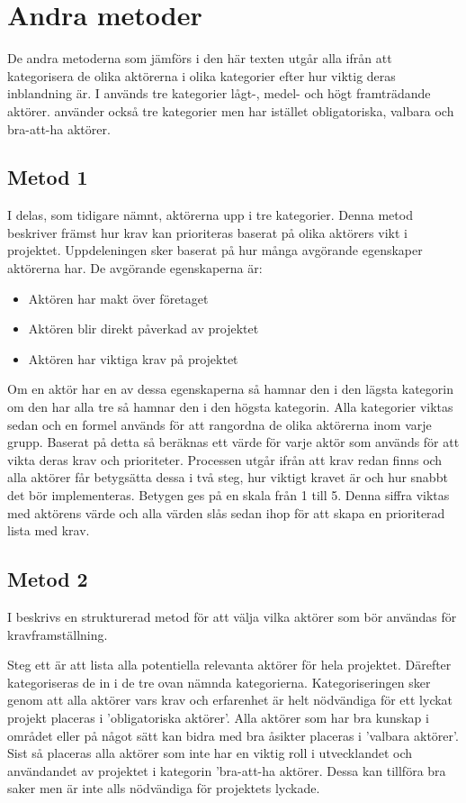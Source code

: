 \section{Andra metoder}
De andra metoderna som jämförs i den här texten utgår alla ifrån att kategorisera de olika aktörerna i olika kategorier efter hur viktig deras inblandning är. I \cite{cs_novel} används tre kategorier lågt-, medel- och högt framträdande aktörer. \cite{cs_sturctured} använder också tre kategorier men har istället obligatoriska, valbara och bra-att-ha aktörer.

\subsection{Metod 1}
I \cite{cs_novel} delas, som tidigare nämnt, aktörerna upp i tre kategorier. Denna metod beskriver främst hur krav kan prioriteras baserat på olika aktörers vikt i projektet.
Uppdeleningen sker baserat på hur många avgörande egenskaper aktörerna har. De avgörande egenskaperna är:
\begin{itemize}
	\item Aktören har makt över företaget
	\item Aktören blir direkt påverkad av projektet
	\item Aktören har viktiga krav på projektet
\end{itemize}

Om en aktör har en av dessa egenskaperna så hamnar den i den lägsta kategorin om den har alla tre så hamnar den i den högsta kategorin. Alla kategorier viktas sedan och en formel används för att rangordna de olika aktörerna inom varje grupp. Baserat på detta så beräknas ett värde för varje aktör som används för att vikta deras krav och prioriteter. Processen utgår ifrån att krav redan finns och alla aktörer får betygsätta dessa i två steg, hur viktigt kravet är och hur snabbt det bör implementeras. Betygen ges på en skala från 1 till 5. Denna siffra viktas med aktörens värde och alla värden slås sedan ihop för att skapa en prioriterad lista med krav.

\subsection{Metod 2}
I \cite{cs_structured} beskrivs en strukturerad metod för att välja vilka aktörer som bör användas för kravframställning.

Steg ett är att lista alla potentiella relevanta aktörer för hela projektet.
Därefter kategoriseras de in i de tre ovan nämnda kategorierna. Kategoriseringen sker genom att alla aktörer vars krav och erfarenhet är helt nödvändiga för ett lyckat projekt placeras i 'obligatoriska aktörer'. Alla aktörer som har bra kunskap i området eller på något sätt kan bidra med bra åsikter placeras i 'valbara aktörer'. Sist så placeras alla aktörer som inte har en viktig roll i utvecklandet och användandet av projektet i kategorin 'bra-att-ha aktörer. Dessa kan tillföra bra saker men är inte alls nödvändiga för projektets lyckade.

